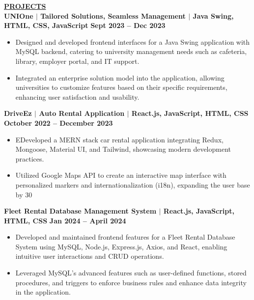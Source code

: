 \documentclass{article}
\begin{document}
\vspace{2mm}



\noindent \textbf{\underline{PROJECTS}} \\
\textbf{\textbf{UNIOne } $\mid$ Tailored Solutions, Seamless Management $\mid$ Java Swing, HTML, CSS, JavaScript} \hfill {\textbf{\textbf{Sept 2023 – Dec 2023} }}
\begin{itemize}[noitemsep,nolistsep,leftmargin=*]
   \item Designed and developed frontend interfaces for a Java Swing application with MySQL backend, catering to university management needs such as cafeteria, library, employer portal, and IT support.
    \item Integrated an enterprise solution model into the application, allowing universities to customize features based on their specific requirements, enhancing user satisfaction and usability.

\end{itemize}
\textbf{\textbf{DriveEz } $\mid$ Auto Rental Application $\mid$ React.js, JavaScript, HTML, CSS} \hfill \textbf{\textbf{October 2022 – December 2023}}
\begin{itemize}[noitemsep,nolistsep,leftmargin=*]
    \item EDeveloped a MERN stack car rental application integrating Redux, Mongoose, Material UI, and Tailwind, showcasing modern development practices.
    \item Utilized Google Maps API to create an interactive map interface with personalized markers and internationalization (i18n), expanding the user base by 30%

\end{itemize}
\textbf{\textbf{Fleet Rental Database Management System $\mid$ React.js, JavaScript, HTML, CSS}  } \hfill \textbf{\textbf{Jan 2024 – April 2024} }
\begin{itemize}[noitemsep,nolistsep,leftmargin=*]
   \item Developed and maintained frontend features for a Fleet Rental Database System using MySQL, Node.js, Express.js, Axios, and React, enabling intuitive user interactions and CRUD operations.
    \item Leveraged MySQL's advanced features such as user-defined functions, stored procedures, and triggers to enforce business rules and enhance data integrity in the application.


\end{itemize}
\end{document}
